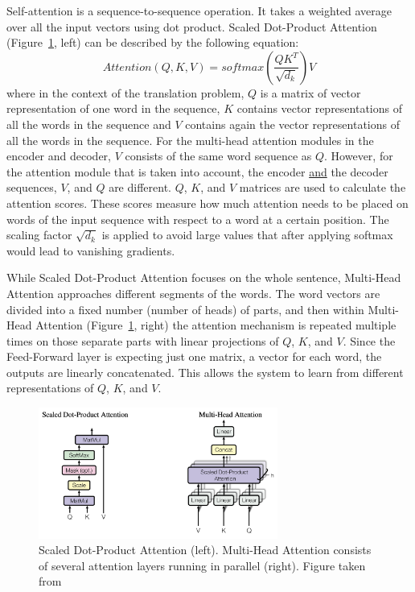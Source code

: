 Self-attention is a sequence-to-sequence operation.
It takes a weighted average over all the input vectors using dot product.
Scaled Dot-Product Attention (Figure~\ref{fig:trans_attn}, left) can be described by the following equation:
\begin{equation} \label{eq:1}
Attention(Q,K,V) = softmax(\frac{QK^T}{\sqrt{d_k}})V
\end{equation}
where in the context of the translation problem,
$Q$ is a matrix of vector representation of one word in the sequence,
$K$ contains vector representations of all the words in the sequence and
$V$ contains again the vector representations of all the words in the sequence.
For the multi-head attention modules in the encoder and decoder,
$V$ consists of the same word sequence as $Q$.
However, for the attention module that is taken into account,
the encoder \underline{and} the decoder sequences, $V$, and $Q$ are different.
$Q$, $K$, and $V$ matrices are used to calculate the attention scores.
These scores measure how much attention needs
to be placed on words of the input sequence with respect to a word at a certain position.
The scaling factor $\sqrt{d_k}$ is applied to avoid large values that after 
applying softmax would lead to vanishing gradients.

While Scaled Dot-Product Attention focuses on the whole sentence, 
Multi-Head Attention approaches different segments of the words.
The word vectors are divided into a fixed number (number of heads) of parts,
and then within Multi-Head Attention (Figure~\ref{fig:trans_attn}, right) 
the attention mechanism is repeated multiple times on those separate parts with linear projections of $Q$, $K$, and $V$.
Since the Feed-Forward layer is expecting just one matrix, a vector for each word,
the outputs are linearly concatenated.
This allows the system to learn from different representations of $Q$, $K$, and $V$.

\begin{figure}[h] %
    \centering
    \includegraphics[width=0.7\textwidth]{figures/03_blocks_overview.png} %
    \caption{Scaled Dot-Product Attention (left). Multi-Head Attention consists of several attention layers running in parallel (right). Figure taken from~\cite{vaswani2017attention}} %
    \label{fig:trans_attn} %
\end{figure} 

